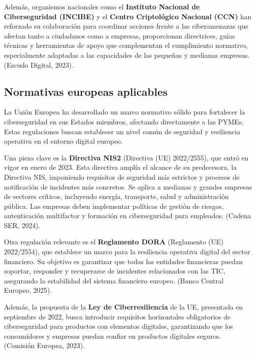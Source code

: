 \documentclass[a4paper, 10pt]{article}
\begin{document}
    Además, organismos nacionales como el \textbf{Instituto Nacional de Ciberseguridad (INCIBE)} y el \textbf{Centro Criptológico Nacional (CCN)}  han reforzado su colaboración para coordinar acciones frente a las ciberamenazas que afectan tanto a ciudadanos como a empresas, 
    proporcionan directrices, guías técnicas y herramientas de apoyo que complementan el cumplimiento normativo, 
    especialmente adaptadas a las capacidades de las pequeñas y medianas empresas. (Escudo Digital, 2023). \cite{escudo2023}

\subsection{Normativas europeas aplicables}

    La Unión Europea ha desarrollado un marco normativo sólido para fortalecer la ciberseguridad en sus Estados miembros, afectando directamente a las PYMEs. Estas regulaciones buscan establecer un nivel común de seguridad y resiliencia operativa en el entorno digital europeo.
    \par\vspace{0.5cm}

    Una pieza clave es la \textbf{Directiva NIS2} (Directiva (UE) 2022/2555), que entró en vigor en enero de 2023. Esta directiva amplía el alcance de su predecesora, la Directiva NIS, imponiendo requisitos de seguridad más estrictos y procesos de notificación de incidentes más concretos. Se aplica a medianas y grandes empresas de sectores críticos, incluyendo energía, transporte, salud y administración pública. Las empresas deben implementar políticas de gestión de riesgos, autenticación multifactor y formación en ciberseguridad para empleados. (Cadena SER, 2024). \cite{cadena_ser}
    \par\vspace{0.5cm}

    Otra regulación relevante es el \textbf{Reglamento DORA} (Reglamento (UE) 2022/2554), que establece un marco para la resiliencia operativa digital del sector financiero. Su objetivo es garantizar que todas las entidades financieras puedan soportar, responder y recuperarse de incidentes relacionados con las TIC, asegurando la estabilidad del sistema financiero europeo. (Banco Central Europeo, 2025). \cite{bce}
    \par\vspace{0.5cm}

    Además, la propuesta de la \textbf{Ley de Ciberresiliencia} de la UE, presentada en septiembre de 2022, busca introducir requisitos horizontales obligatorios de ciberseguridad para productos con elementos digitales, garantizando que los consumidores y empresas puedan confiar en productos digitales seguros. (Comisión Europea, 2023). \cite{comision_europea}
    
\end{document}
